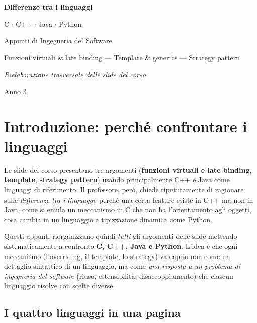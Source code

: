 \documentclass{report}
\begin{document}
\begin{titlepage}
    \centering
    \vspace*{3cm}
    {\Huge\sffamily\bfseries Differenze tra i linguaggi\par}
    \vspace{0.6cm}
    {\LARGE\sffamily C \; $\cdot$ \; C++ \; $\cdot$ \; Java \; $\cdot$ \; Python\par}
    \vspace{1.2cm}
    {\Large Appunti di Ingegneria del Software\par}
    \vspace{0.4cm}
    {\large Funzioni virtuali \& late binding \; --- \; Template \& generics \; --- \; Strategy pattern\par}
    \vspace{2cm}
    {\large\itshape Rielaborazione trasversale delle slide del corso\par}
    \vfill
    {\large Anno 3\par}
\end{titlepage}

\tableofcontents
\newpage

\chapter{Introduzione: perché confrontare i linguaggi}

Le slide del corso presentano tre argomenti (\textbf{funzioni virtuali e late
binding}, \textbf{template}, \textbf{strategy pattern}) usando principalmente
C++ e Java come linguaggi di riferimento. Il professore, però, chiede
ripetutamente di ragionare sulle \emph{differenze tra i linguaggi}: perché una
certa feature esiste in C++ ma non in Java, come si emula un meccanismo in C
che non ha l'orientamento agli oggetti, cosa cambia in un linguaggio a
tipizzazione dinamica come Python.

Questi appunti riorganizzano quindi \emph{tutti} gli argomenti delle slide
mettendo sistematicamente a confronto \textbf{C, C++, Java e Python}. L'idea è
che ogni meccanismo (l'overriding, il template, lo strategy) va capito non
come un dettaglio sintattico di un linguaggio, ma come \emph{una risposta a un
problema di ingegneria del software} (riuso, estensibilità, disaccoppiamento)
che ciascun linguaggio risolve con scelte diverse.

\section{I quattro linguaggi in una pagina}
\end{document}
